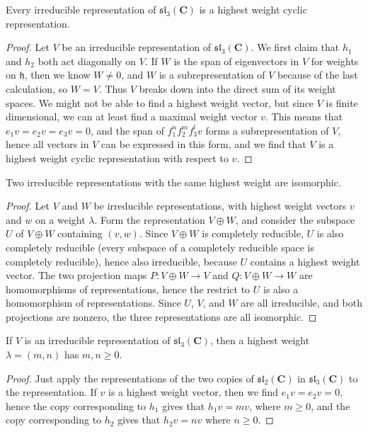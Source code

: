 \begin{theorem}
    Every irreducible representation of $\mathfrak{sl}_3(\mathbf{C})$ is a highest weight cyclic representation.
\end{theorem}
\begin{proof}
    Let $V$ be an irreducible representation of $\mathfrak{sl}_3(\mathbf{C})$. We first claim that $h_1$ and $h_2$ both act diagonally on $V$. If $W$ is the span of eigenvectors in $V$ for weights on $\mathfrak{h}$, then we know $W \neq 0$, and $W$ is a subrepresentation of $V$ because of the last calculation, so $W = V$. Thus $V$ breaks down into the direct sum of its weight spaces. We might not be able to find a highest weight vector, but since $V$ is finite dimensional, we can at least find a maximal weight vector $v$. This means that $e_1v = e_2v = e_3v = 0$, and the span of $f_1^n f_2^m f_3^l v$ forms a subrepresentation of $V$, hence all vectors in $V$ can be expressed in this form, and we find that $V$ is a highest weight cyclic representation with respect to $v$.
\end{proof}

\begin{theorem}
    Two irreducible representations with the same highest weight are isomorphic.
\end{theorem}
\begin{proof}
    Let $V$ and $W$ be irreducible representations, with highest weight vectors $v$ and $w$ on a weight $\lambda$. Form the representation $V \oplus W$, and consider the subspace $U$ of $V \oplus W$ containing $(v,w)$. Since $V \oplus W$ is completely reducible, $U$ is also completely reducible (every subspace of a completely reducible space is completely reducible), hence also irreducible, because $U$ contains a highest weight vector. The two projection maps $P: V \oplus W \to V$ and $Q: V \oplus W \to W$ are homomorphisms of representations, hence the restrict to $U$ is also a homomorphism of representations. Since $U$, $V$, and $W$ are all irreducible, and both projections are nonzero, the three representations are all isomorphic.
\end{proof}

\begin{theorem}
    If $V$ is an irreducible representation of $\mathfrak{sl}_3(\mathbf{C})$, then a highest weight $\lambda = (m,n)$ has $m,n \geq 0$.
\end{theorem}
\begin{proof}
    Just apply the representations of the two copies of $\mathfrak{sl}_2(\mathbf{C})$ in $\mathfrak{sl}_3(\mathbf{C})$ to the representation. If $v$ is a highest weight vector, then we find $e_1v = e_2v = 0$, hence the copy corresponding to $h_1$ gives that $h_1v = mv$, where $m \geq 0$, and the copy corresponding to $h_2$ gives that $h_2v = nv$ where $n \geq 0$.
\end{proof}

